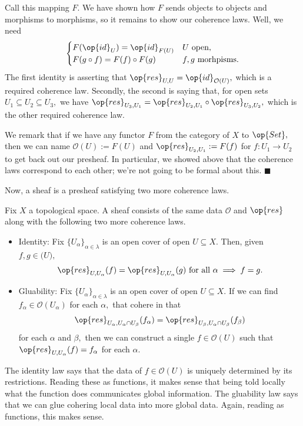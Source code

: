 Call this mapping $F.$ We have shown how $F$ sends objects to objects and morphisms to morphisms, so it remains to show our coherence laws. Well, we need
\[\begin{cases}
    F(\op{id}_U)=\op{id}_{F(U)} & U\text{ open},\\
    F(g\circ f)=F(f)\circ F(g) & f,g\text{ morhpisms}.
\end{cases}\]
The first identity is asserting that $\op{res}_{U,U}=\op{id}_{\mathcal O(U)},$ which is a required coherence law. Secondly, the second is saying that, for open sets $U_1\subseteq U_2\subseteq U_3,$ we have $\op{res}_{U_3,U_1}=\op{res}_{U_2,U_1}\circ\op{res}_{U_3,U_2},$ which is the other required coherence law.

We remark that if we have any functor $F$ from the category of $X$ to $\op{Set},$ then we can name $\mathcal O(U):=F(U)$ and $\op{res}_{U_2,U_1}:=F(f)$ for $f:U_1\to U_2$ to get back out our presheaf. In particular, we showed above that the coherence laws correspond to each other; we're not going to be formal about this. $\blacksquare$

Now, a sheaf is a presheaf satisfying two more coherence laws.
\begin{definition}
    Fix $X$ a topological space. A sheaf consists of the same data $\mathcal O$ and $\op{res}$ along with the following two more coherence laws.
    \begin{itemize}
        \item Identity: Fix $\{U_\alpha\}_{\alpha\in\lambda}$ is an open cover of open $U\subseteq X.$ Then, given $f,g\in\mathcal (U),$
        \[\op{res}_{U,U_\alpha}(f)=\op{res}_{U,U_\alpha}(g)\text{ for all }\alpha\implies f=g.\]
        \item Gluability: Fix $\{U_\alpha\}_{\alpha\in\lambda}$ is an open cover of open $U\subseteq X.$ If we can find $f_\alpha\in\mathcal O(U_\alpha)$ for each $\alpha,$ that cohere in that
        \[\op{res}_{U_\alpha,U_\alpha\cap U_\beta}(f_\alpha)=\op{res}_{U_\beta,U_\alpha\cap U_\beta}(f_\beta)\]
        for each $\alpha$ and $\beta,$ then we can construct a single $f\in\mathcal O(U)$ such that $\op{res}_{U,U_\alpha}(f)=f_\alpha$ for each $\alpha.$
    \end{itemize}
\end{definition}
The identity law says that the data of $f\in\mathcal O(U)$ is uniquely determined by its restrictions. Reading these as functions, it makes sense that being told locally what the function does communicates global information. The gluability law says that we can glue cohering local data into more global data. Again, reading as functions, this makes sense.

